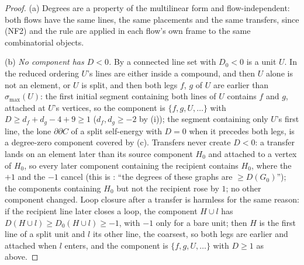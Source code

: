 \begin{proof}
(a) Degrees are a property of the multilinear form and flow-independent: both flows have the same lines, the same placements and the same transfers, since (NF2) and the rule are applied in each flow's own frame to the same combinatorial objects.

(b) \emph{No component has $D<0$.} By  a connected line set with $D_0<0$ is a unit $U$. In the reduced ordering $U$'s lines are either inside a compound, and then $U$ alone is not an element, or $U$ is split, and then both legs $f$, $g$ of $U$ are earlier than $\sigma_{\max}(U)$: the first initial segment containing both lines of $U$ contains $f$ and $g$, attached at $U$'s vertices, so the component is $\{f,g,U,\dots\}$ with $D\ge d_f+d_g-4+9\ge1$ ($d_f,d_g\ge-2$ by (i)); the segment containing only $U$'s first line, the lone $\partial\partial C$ of a split self-energy with $D=0$ when it precedes both legs, is a degree-zero component covered by (c). Transfers never create $D<0$: a transfer lands on an element later than its source component $H_0$ and attached to a vertex of $H_0$, so every later component containing the recipient contains $H_0$, where the $+1$ and the $-1$ cancel (this is \cite[(2.8)--(2.9)]{Ba3}: ``the degrees of these graphs are $\ge D(G_0)$''); the components containing $H_0$ but not the recipient rose by $1$; no other component changed. Loop closure after a transfer is harmless for the same reason: if the recipient line later closes a loop, the component $H\cup l$ has $D(H\cup l)\ge D_0(H\cup l)\ge-1$, with $-1$ only for a bare unit; then $H$ is the first line of a split unit and $l$ its other line, the coarsest, so both legs are earlier and attached when $l$ enters, and the component is $\{f,g,U,\dots\}$ with $D\ge1$ as above.


\end{proof}
